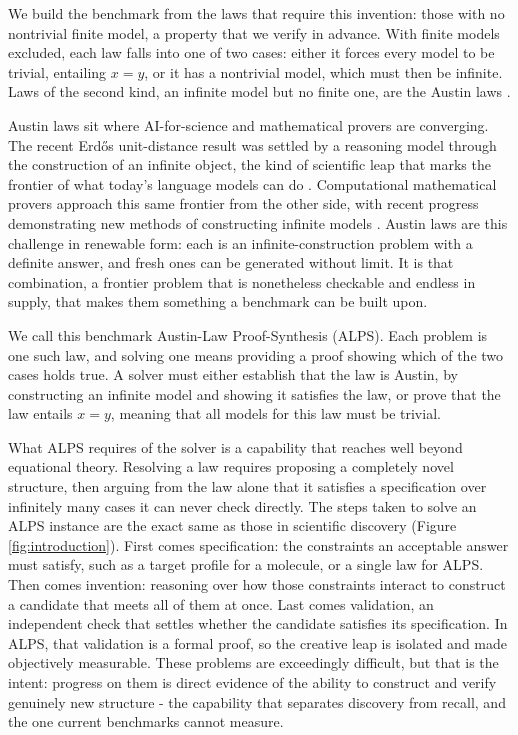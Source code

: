 \documentclass[letterpaper]{article} %
\begin{document}
We build the benchmark from the laws that require this invention: those with no nontrivial finite model, a property that we verify in advance. With finite models excluded, each law falls into one of two cases: either it forces every model to be trivial, entailing $x = y$, or it has a nontrivial model, which must then be infinite. Laws of the second kind, an infinite model but no finite one, are the Austin laws \citep{kisielewicz1997austin}. 

Austin laws sit where AI-for-science and mathematical provers are converging. The recent Erdős unit-distance result was settled by a reasoning model through the construction of an infinite object, the kind of scientific leap that marks the frontier of what today's language models can do \citep{openai2026unitdistance}. Computational mathematical provers approach this same frontier from the other side, with recent progress demonstrating new methods of constructing infinite models \citep{janota2026case}. Austin laws are this challenge in renewable form: each is an infinite-construction problem with a definite answer, and fresh ones can be generated without limit. It is that combination, a frontier problem that is nonetheless checkable and endless in supply, that makes them something a benchmark can be built upon. 

We call this benchmark Austin-Law Proof-Synthesis (ALPS). Each problem is one such law, and solving one means providing a proof showing which of the two cases holds true. A solver must either establish that the law is Austin, by constructing an infinite model and showing it satisfies the law, or prove that the law entails $x = y$, meaning that all models for this law must be trivial. 


What ALPS requires of the solver is a capability that reaches well beyond equational theory. Resolving a law requires proposing a completely novel structure, then arguing from the law alone that it satisfies a specification over infinitely many cases it can never check directly. The steps taken to solve an ALPS instance are the exact same as those in scientific discovery (Figure \ref{fig:introduction}). First comes specification: the constraints an acceptable answer must satisfy, such as a target profile for a molecule, or a single law for ALPS. Then comes invention: reasoning over how those constraints interact to construct a candidate that meets all of them at once. Last comes validation, an independent check that settles whether the candidate satisfies its specification. In ALPS, that validation is a formal proof, so the creative leap is isolated and made objectively measurable. These problems are exceedingly difficult, but that is the intent: progress on them is direct evidence of the ability to construct and verify genuinely new structure - the capability that separates discovery from recall, and the one current benchmarks cannot measure.
\end{document}
